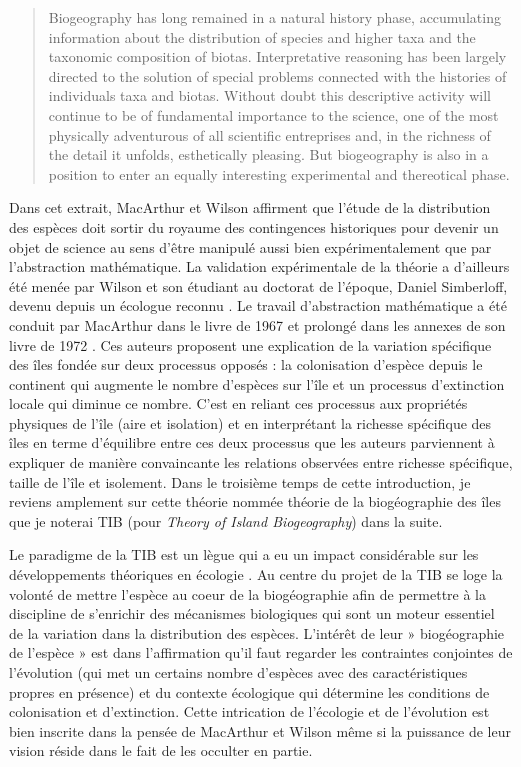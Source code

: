 \begin{quote}
Biogeography has long remained in a natural history phase, accumulating
information about the distribution of species and higher taxa and the
taxonomic composition of biotas. Interpretative reasoning has been
largely directed to the solution of special problems connected with the
histories of individuals taxa and biotas. Without doubt this descriptive
activity will continue to be of fundamental importance to the science,
one of the most physically adventurous of all scientific entreprises
and, in the richness of the detail it unfolds, esthetically pleasing.
But biogeography is also in a position to enter an equally interesting
experimental and thereotical phase.
\end{quote}

Dans cet extrait, MacArthur et Wilson affirment que l'étude de la
distribution des espèces doit sortir du royaume des contingences
historiques pour devenir un objet de science au sens d'être manipulé
aussi bien expérimentalement que par l'abstraction mathématique. La
validation expérimentale de la théorie a d'ailleurs été menée par Wilson
et son étudiant au doctorat de l'époque, Daniel Simberloff, devenu
depuis un écologue reconnu \citep{Simberloff1969}. Le travail
d'abstraction mathématique a été conduit par MacArthur dans le livre de
1967 et prolongé dans les annexes de son livre de 1972
\citep{macarthur1972geographical}. Ces auteurs proposent une explication
de la variation spécifique des îles fondée sur deux processus opposés :
la colonisation d'espèce depuis le continent qui augmente le nombre
d'espèces sur l'île et un processus d'extinction locale qui diminue ce
nombre. C'est en reliant ces processus aux propriétés physiques de l'île
(aire et isolation) et en interprétant la richesse spécifique des îles
en terme d'équilibre entre ces deux processus que les auteurs
parviennent à expliquer de manière convaincante les relations observées
entre richesse spécifique, taille de l'île et isolement. Dans le
troisième temps de cette introduction, je reviens amplement sur cette
théorie nommée théorie de la biogéographie des îles que je noterai TIB
(pour \emph{Theory of Island Biogeography}) dans la suite.

Le paradigme de la TIB est un lègue qui a eu un impact considérable sur
les développements théoriques en écologie \citep{Warren2015}. Au centre
du projet de la TIB se loge la volonté de mettre l'espèce au coeur de la
biogéographie afin de permettre à la discipline de s'enrichir des
mécanismes biologiques qui sont un moteur essentiel de la variation dans
la distribution des espèces. L'intérêt de leur » biogéographie de
l'espèce » \citep[le terme est mentionné à l'avant-dernière phrase de
l'ouvrage][p.183]{MacArthur1967} est dans l'affirmation qu'il faut
regarder les contraintes conjointes de l'évolution (qui met un certains
nombre d'espèces avec des caractéristiques propres en présence) et du
contexte écologique qui détermine les conditions de colonisation et
d'extinction. Cette intrication de l'écologie et de l'évolution est bien
inscrite dans la pensée de MacArthur et Wilson même si la puissance de
leur vision réside dans le fait de les occulter en partie.

